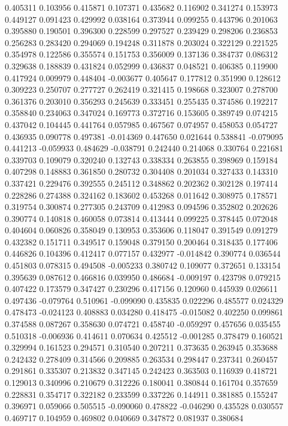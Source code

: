 0.405311
0.103956
0.415871
0.107371
0.435682
0.116902
0.341274
0.153973
0.449127
0.091423
0.429992
0.038164
0.373944
0.099255
0.443796
0.201063
0.395880
0.190501
0.396300
0.228599
0.297527
0.239429
0.298206
0.236853
0.256283
0.283420
0.294069
0.194248
0.311878
0.203024
0.322129
0.221525
0.354978
0.122586
0.355574
0.151753
0.356009
0.137136
0.384737
0.086312
0.329638
0.188839
0.431824
0.052999
0.436837
0.048521
0.406385
0.119900
0.417924
0.009979
0.448404
-0.003677
0.405647
0.177812
0.351990
0.128612
0.309223
0.250707
0.277727
0.262419
0.321415
0.198668
0.323007
0.278700
0.361376
0.203010
0.356293
0.245639
0.333451
0.255435
0.374586
0.192217
0.358840
0.234063
0.347024
0.169773
0.372716
0.153605
0.389749
0.074215
0.437042
0.104445
0.441764
0.057985
0.467567
0.074957
0.458053
0.054727
0.436935
0.090778
0.497381
-0.014369
0.447650
0.021644
0.538841
-0.079095
0.441213
-0.059933
0.484629
-0.038791
0.242440
0.214068
0.330764
0.221681
0.339703
0.109079
0.320240
0.132743
0.338334
0.263855
0.398969
0.159184
0.407298
0.148883
0.361850
0.280732
0.304408
0.201034
0.327433
0.143310
0.337421
0.229476
0.392555
0.245112
0.348862
0.202362
0.302128
0.197414
0.228286
0.274388
0.324162
0.183602
0.453268
0.011642
0.308975
0.178571
0.319754
0.300874
0.277305
0.243709
0.412983
0.094596
0.352802
0.202626
0.390774
0.140818
0.460058
0.073814
0.413444
0.099225
0.378445
0.072048
0.404604
0.060826
0.358049
0.130953
0.353606
0.118047
0.391549
0.091279
0.432382
0.151711
0.349517
0.159048
0.379150
0.200464
0.318435
0.177406
0.446826
0.104396
0.412417
0.077157
0.432977
-0.014842
0.390774
0.036544
0.451803
0.078315
0.494508
-0.005233
0.380742
0.109077
0.372651
0.133154
0.395639
0.087612
0.466816
0.039950
0.486684
-0.009197
0.423798
0.079215
0.407422
0.173579
0.347427
0.230296
0.417156
0.120960
0.445939
0.026611
0.497436
-0.079764
0.510961
-0.099090
0.435835
0.022296
0.485577
0.024329
0.478473
-0.024123
0.408883
0.034280
0.418475
-0.015082
0.402250
0.099861
0.374588
0.087267
0.358630
0.074721
0.458740
-0.059297
0.457656
0.035455
0.510318
-0.006936
0.414611
0.070634
0.425512
-0.001285
0.378479
0.160521
0.329994
0.161523
0.294571
0.310540
0.207211
0.373635
0.263945
0.353688
0.242432
0.278409
0.314566
0.209885
0.263534
0.298447
0.237341
0.260457
0.291861
0.335307
0.213832
0.347145
0.242423
0.363503
0.116939
0.418721
0.129013
0.340996
0.210679
0.312226
0.180041
0.380844
0.161704
0.357659
0.228831
0.354717
0.322182
0.233599
0.337226
0.144911
0.381885
0.155247
0.396971
0.059066
0.505515
-0.090060
0.478822
-0.046290
0.435528
0.030557
0.469717
0.104959
0.469802
0.040669
0.347872
0.081937
0.380684
